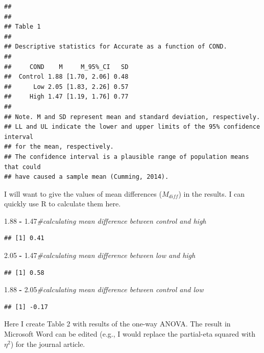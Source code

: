\documentclass[
  english,
]{book}
\newenvironment{Shaded}{\begin{snugshade}}{\end{snugshade}}
\newcommand{\CommentTok}[1]{\textcolor[rgb]{0.56,0.35,0.01}{\textit{#1}}}
\newcommand{\FloatTok}[1]{\textcolor[rgb]{0.00,0.00,0.81}{#1}}
\newcommand{\OperatorTok}[1]{\textcolor[rgb]{0.81,0.36,0.00}{\textbf{#1}}}
\newcommand{\StringTok}[1]{\textcolor[rgb]{0.31,0.60,0.02}{#1}}
\begin{document}
\begin{verbatim}
## 
## 
## Table 1 
## 
## Descriptive statistics for Accurate as a function of COND.  
## 
##     COND    M     M_95%_CI   SD
##  Control 1.88 [1.70, 2.06] 0.48
##      Low 2.05 [1.83, 2.26] 0.57
##     High 1.47 [1.19, 1.76] 0.77
## 
## Note. M and SD represent mean and standard deviation, respectively.
## LL and UL indicate the lower and upper limits of the 95% confidence interval 
## for the mean, respectively. 
## The confidence interval is a plausible range of population means that could 
## have caused a sample mean (Cumming, 2014).
\end{verbatim}

I will want to give the values of mean differences (\(M_{diff}\)) in the results. I can quickly use R to calculate them here.

\begin{Shaded}
\begin{Highlighting}[]
\FloatTok{1.88} \OperatorTok{-}\StringTok{ }\FloatTok{1.47}\CommentTok{#calculating mean difference between control and high}
\end{Highlighting}
\end{Shaded}

\begin{verbatim}
## [1] 0.41
\end{verbatim}

\begin{Shaded}
\begin{Highlighting}[]
\FloatTok{2.05} \OperatorTok{-}\StringTok{ }\FloatTok{1.47}\CommentTok{#calculating mean difference between low and high}
\end{Highlighting}
\end{Shaded}

\begin{verbatim}
## [1] 0.58
\end{verbatim}

\begin{Shaded}
\begin{Highlighting}[]
\FloatTok{1.88} \OperatorTok{-}\StringTok{ }\FloatTok{2.05}\CommentTok{#calculating mean difference between  control and low}
\end{Highlighting}
\end{Shaded}

\begin{verbatim}
## [1] -0.17
\end{verbatim}

Here I create Table 2 with results of the one-way ANOVA. The result in Microsoft Word can be edited (e.g., I would replace the partial-eta squared with \(\eta^2\)) for the journal article.
\end{document}
